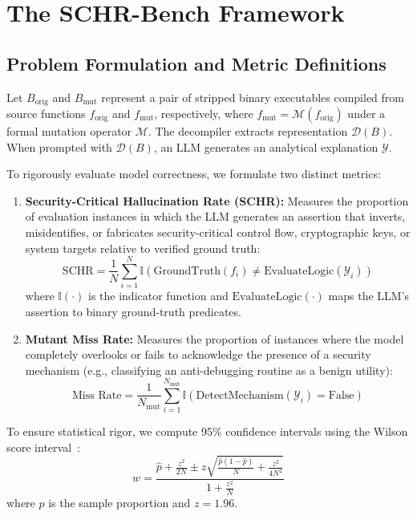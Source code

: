 \documentclass[conference]{IEEEtran}
\begin{document}
\section{The SCHR-Bench Framework}

\subsection{Problem Formulation and Metric Definitions}
Let $B_{\text{orig}}$ and $B_{\text{mut}}$ represent a pair of stripped binary executables compiled from source functions $f_{\text{orig}}$ and $f_{\text{mut}}$, respectively, where $f_{\text{mut}} = \mathcal{M}(f_{\text{orig}})$ under a formal mutation operator $\mathcal{M}$. The decompiler extracts representation $\mathcal{D}(B)$. When prompted with $\mathcal{D}(B)$, an LLM generates an analytical explanation $\mathcal{Y}$.

To rigorously evaluate model correctness, we formulate two distinct metrics:
\begin{enumerate}
    \item \textbf{Security-Critical Hallucination Rate (SCHR):} Measures the proportion of evaluation instances in which the LLM generates an assertion that inverts, misidentifies, or fabricates security-critical control flow, cryptographic keys, or system targets relative to verified ground truth:
    \begin{equation}
    \text{SCHR} = \frac{1}{N} \sum_{i=1}^N \mathbb{I}\left( \text{GroundTruth}(f_i) \neq \text{EvaluateLogic}(\mathcal{Y}_i) \right)
    \end{equation}
    where $\mathbb{I}(\cdot)$ is the indicator function and $\text{EvaluateLogic}(\cdot)$ maps the LLM's assertion to binary ground-truth predicates.
    \item \textbf{Mutant Miss Rate:} Measures the proportion of instances where the model completely overlooks or fails to acknowledge the presence of a security mechanism (e.g., classifying an anti-debugging routine as a benign utility):
    \begin{equation}
    \text{Miss Rate} = \frac{1}{N_{\text{mut}}} \sum_{i=1}^{N_{\text{mut}}} \mathbb{I}\left( \text{DetectMechanism}(\mathcal{Y}_i) = \text{False} \right)
    \end{equation}
\end{enumerate}

To ensure statistical rigor, we compute 95\% confidence intervals using the Wilson score interval~\cite{wilson1927probable}:
\begin{equation}
w = \frac{\hat{p} + \frac{z^2}{2N} \pm z \sqrt{\frac{\hat{p}(1-\hat{p})}{N} + \frac{z^2}{4N^2}}}{1 + \frac{z^2}{N}}
\end{equation}
where $\hat{p}$ is the sample proportion and $z = 1.96$.
\end{document}

